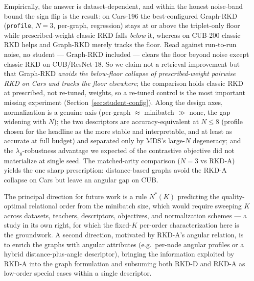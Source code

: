 \documentclass[11pt,letterpaper]{article}
\begin{document}
Empirically, the answer is dataset-dependent, and within the honest noise-band bound the
sign flip is the result: on Cars-196 the best-configured Graph-RKD (\texttt{profile},
$N{=}3$, per-graph, regression) stays at or above the triplet-only floor while
prescribed-weight classic RKD falls \emph{below} it, whereas on CUB-200 classic RKD helps
and Graph-RKD merely tracks the floor. Read against run-to-run noise, no student ---
Graph-RKD included --- clears the floor beyond noise except classic RKD on CUB/ResNet-18.
So we claim not a retrieval improvement but that Graph-RKD \emph{avoids the below-floor
collapse of prescribed-weight pairwise RKD on Cars and tracks the floor elsewhere}; the
comparison holds classic RKD at prescribed, not re-tuned, weights, so a re-tuned control
is the most important missing experiment (Section~\ref{sec:student-config}). Along the
design axes, normalization is a genuine axis (per-graph $\approx$ minibatch $\gg$ none, the
gap widening with $N$); the two descriptors are accuracy-equivalent at $N \leq 8$ (profile
chosen for the headline as the more stable and interpretable, and at least as accurate at
full budget) and separated only by MDS's large-$N$ degeneracy; and the
$\lambda_g$-robustness advantage we expected of the contrastive objective did not
materialize at single seed. The matched-arity comparison ($N{=}3$ vs RKD-A) yields the one
sharp prescription: distance-based graphs avoid the RKD-A collapse on Cars but leave an
angular gap on CUB.

The principal direction for future work is a rule $N^\ast(K)$ predicting the
quality-optimal relational order from the minibatch size, which would require sweeping
$K$ across datasets, teachers, descriptors, objectives, and normalization schemes --- a
study in its own right, for which the fixed-$K$ per-order characterization here is the
groundwork. A second direction, motivated by RKD-A's angular relation, is to enrich the
graphs with angular attributes (e.g.\ per-node angular profiles or a hybrid
distance-plus-angle descriptor), bringing the information exploited by RKD-A into the
graph formulation and subsuming both RKD-D and RKD-A as low-order special cases within a
single descriptor.
\end{document}
